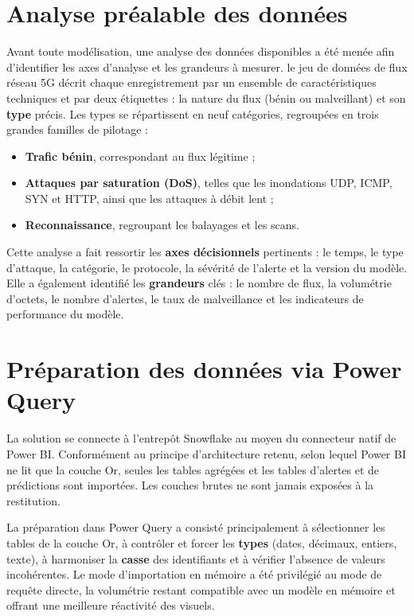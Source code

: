 \documentclass[12pt,a4paper,oneside]{report}
\newcommand{\dataset}{le jeu de données de flux réseau 5G}
\begin{document}
\section{Analyse préalable des données}
Avant toute modélisation, une analyse des données disponibles a été menée afin d'identifier les axes d'analyse et les grandeurs à mesurer. \dataset{} décrit chaque enregistrement par un ensemble de caractéristiques techniques et par deux étiquettes : la nature du flux (bénin ou malveillant) et son \textbf{type} précis. Les types se répartissent en neuf catégories, regroupées en trois grandes familles de pilotage :

\begin{itemize}[leftmargin=1.4em]
  \item \textbf{Trafic bénin}, correspondant au flux légitime ;
  \item \textbf{Attaques par saturation (DoS)}, telles que les inondations UDP, ICMP, SYN et HTTP, ainsi que les attaques à débit lent ;
  \item \textbf{Reconnaissance}, regroupant les balayages et les scans.
\end{itemize}

Cette analyse a fait ressortir les \textbf{axes décisionnels} pertinents : le temps, le type d'attaque, la catégorie, le protocole, la sévérité de l'alerte et la version du modèle. Elle a également identifié les \textbf{grandeurs} clés : le nombre de flux, la volumétrie d'octets, le nombre d'alertes, le taux de malveillance et les indicateurs de performance du modèle.

\section{Préparation des données via Power Query}
La solution se connecte à l'entrepôt Snowflake au moyen du connecteur natif de Power BI. Conformément au principe d'architecture retenu, selon lequel Power BI ne lit que la couche Or, seules les tables agrégées et les tables d'alertes et de prédictions sont importées. Les couches brutes ne sont jamais exposées à la restitution.

La préparation dans Power Query a consisté principalement à sélectionner les tables de la couche Or, à contrôler et forcer les \textbf{types} (dates, décimaux, entiers, texte), à harmoniser la \textbf{casse} des identifiants et à vérifier l'absence de valeurs incohérentes. Le mode d'importation en mémoire a été privilégié au mode de requête directe, la volumétrie restant compatible avec un modèle en mémoire et offrant une meilleure réactivité des visuels.
\end{document}
